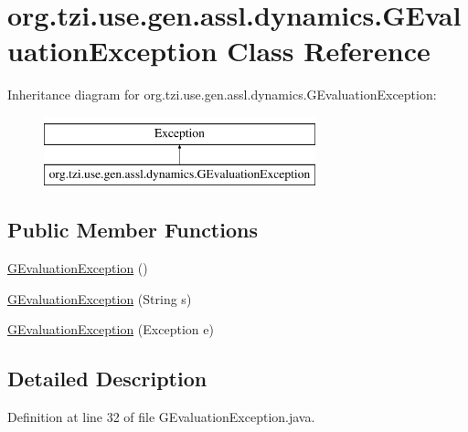 \hypertarget{classorg_1_1tzi_1_1use_1_1gen_1_1assl_1_1dynamics_1_1_g_evaluation_exception}{\section{org.\-tzi.\-use.\-gen.\-assl.\-dynamics.\-G\-Evaluation\-Exception Class Reference}
\label{classorg_1_1tzi_1_1use_1_1gen_1_1assl_1_1dynamics_1_1_g_evaluation_exception}
}
Inheritance diagram for org.\-tzi.\-use.\-gen.\-assl.\-dynamics.\-G\-Evaluation\-Exception\-:\begin{figure}[H]
\begin{center}
\leavevmode
\includegraphics[height=2.000000cm]{classorg_1_1tzi_1_1use_1_1gen_1_1assl_1_1dynamics_1_1_g_evaluation_exception}
\end{center}
\end{figure}
\subsection*{Public Member Functions}
\begin{DoxyCompactItemize}
\item 
\hyperlink{classorg_1_1tzi_1_1use_1_1gen_1_1assl_1_1dynamics_1_1_g_evaluation_exception_a26aeb7559986f68c49519af3bc4354f5}{G\-Evaluation\-Exception} ()
\item 
\hyperlink{classorg_1_1tzi_1_1use_1_1gen_1_1assl_1_1dynamics_1_1_g_evaluation_exception_a6d82ab6c909b27e7f27fdcb325684b39}{G\-Evaluation\-Exception} (String s)
\item 
\hyperlink{classorg_1_1tzi_1_1use_1_1gen_1_1assl_1_1dynamics_1_1_g_evaluation_exception_afb3d68bc7c3f674b0308cbc1fc876119}{G\-Evaluation\-Exception} (Exception e)
\end{DoxyCompactItemize}


\subsection{Detailed Description}


Definition at line 32 of file G\-Evaluation\-Exception.\-java.



